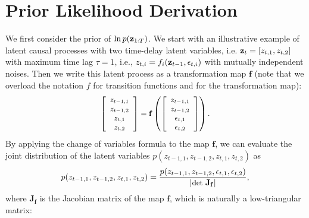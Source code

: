 \section{Prior Likelihood Derivation} \label{app:prior}

 We first consider the prior of $\ln p({\mathbf{z}}_{1:T})$. We start with an illustrative example of latent causal processes with two time-delay latent variables, i.e. ${\mathbf{z}}_t=[z_{t,1}, z_{t,2}]$ with maximum time lag $\tau=1$, i.e., $z_{t,i}=f_i({\mathbf{z}}_{t-1}, \epsilon_{t,i})$ with mutually independent noises. Then we write this latent process as a transformation map $\mathbf{f}$ (note that we overload the notation $f$ for transition functions and for the transformation map):
    \begin{equation}
    \small
\begin{gathered}\nonumber
    \begin{bmatrix}
    \begin{array}{c}
        z_{t-1,1} \\ 
        z_{t-1,2} \\
        z_{t,1}   \\
        z_{t,2}
    \end{array}
    \end{bmatrix}=\mathbf{f}\left(
    \begin{bmatrix}
    \begin{array}{c}
        z_{t-1,1} \\ 
        z_{t-1,2} \\
        \epsilon_{t,1}   \\
        \epsilon_{t,2}
    \end{array}
    \end{bmatrix}\right).
\end{gathered}
\end{equation}
By applying the change of variables formula to the map $\mathbf{f}$, we can evaluate the joint distribution of the latent variables $p(z_{t-1,1},z_{t-1,2},z_{t,1}, z_{t,2})$ as 
\begin{equation}
\small
\label{equ:p1}
    p(z_{t-1,1},z_{t-1,2},z_{t,1}, z_{t,2})=\frac{p(z_{t-1,1}, z_{t-1,2}, \epsilon_{t,1}, \epsilon_{t,2})}{|\text{det }\mathbf{J}_{\mathbf{f}}|},
\end{equation}
where $\mathbf{J}_{\mathbf{f}}$ is the Jacobian matrix of the map $\mathbf{f}$, which is naturally a low-triangular matrix:
